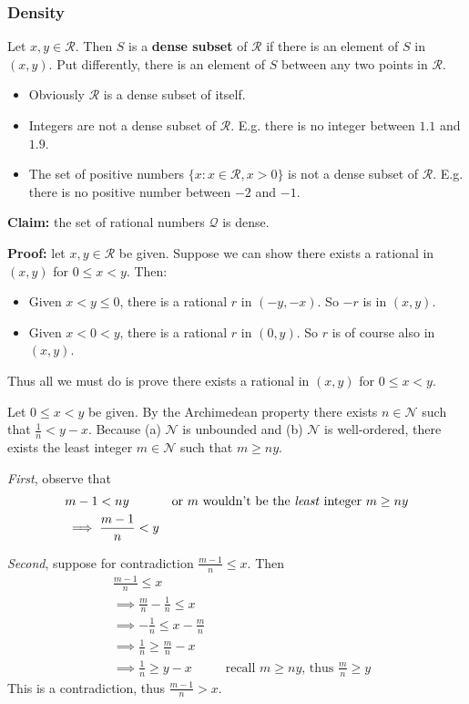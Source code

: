 \subsubsection*{Density}
Let $x,y\in\mathcal{R}$. Then $S$ is a \textbf{dense subset} of
$\mathcal{R}$ if there is an element of $S$ in $(x,y)$. Put differently, there
is an element of $S$ between any two points in $\mathcal{R}$.
\begin{itemize}
\item Obviously $\mathcal{R}$ is a dense subset of itself.
\item Integers are not a dense subset of $\mathcal{R}$. E.g. there is no integer
  between $1.1$ and $1.9$.
\item The set of positive numbers $\{x:x\in\mathcal{R}, x>0\}$ is not a dense
  subset of $\mathcal{R}$. E.g. there is no positive number between
  $-2$ and $-1$.
\end{itemize}

\textbf{Claim:} the set of rational numbers $\mathcal{Q}$ is dense.

\textbf{Proof:} let $x,y\in\mathcal{R}$ be given. Suppose we can show there exists
a rational in $(x, y)$ for $0\leq x<y$. Then:
\begin{itemize}
\item Given $x<y\leq0$, there is a rational $r$ in $(-y, -x)$. So $-r$ is
  in $(x,y)$.
\item Given $x<0<y$, there is a rational $r$ in $(0,y)$. So $r$ is of
  course also in $(x,y)$.
\end{itemize}
Thus all we must do is prove there exists a rational in $(x, y)$ for
$0\leq x<y$.

\vs

Let $0\leq x<y$ be given. By the Archimedean property there exists
$n\in\mathcal{N}$ such that $\frac{1}{n}<y-x$. Because (a)
$\mathcal{N}$ is unbounded and (b) $\mathcal{N}$ is well-ordered, there exists the least
integer $m\in\mathcal{N}$ such that $m\geq ny$.

\vs

\textit{First}, observe that
\begin{align*}
&m-1<ny&&\text{or $m$ wouldn't be the \textit{least} integer $m\geq
          ny$}\\
&\implies\frac{m-1}{n}<y\\
\end{align*}

\textit{Second}, suppose for contradiction $\frac{m-1}{n}\leq x$. Then
\begin{align*}
  &\frac{m-1}{n}\leq x\\
  &\implies \frac{m}{n}-\frac{1}{n}\leq x\\
  &\implies -\frac{1}{n}\leq x-\frac{m}{n}\\
  &\implies \frac{1}{n}\geq \frac{m}{n}-x\\
  &\implies \frac{1}{n}\geq y-x&&\text{recall $m\geq ny$, thus $\frac{m}{n}\geq
                               y$}
\end{align*}
This is a contradiction, thus $\frac{m-1}{n}>x$.

